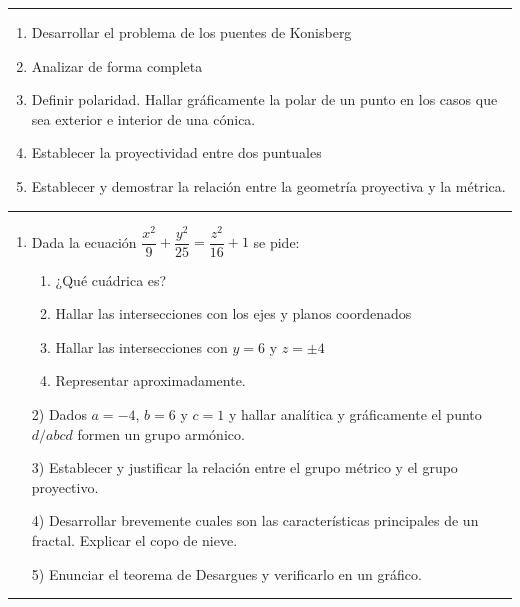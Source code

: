 \documentclass[9pt,a4paper]{extarticle}
\begin{document}
\hrule
{}
\begin{enumerate}

\item Desarrollar el problema de los puentes de Konisberg

\item Analizar de forma completa 

\item Definir polaridad. Hallar gráficamente la polar de un punto en los casos que sea exterior e interior de una cónica.

\item Establecer la proyectividad entre dos puntuales

\item Establecer y demostrar la relación entre la geometría proyectiva y la métrica. 

\end{enumerate}
\hrule

\begin{enumerate}

\item Dada la ecuación $\dfrac{x^2}{9} + \dfrac{y^2}{25}=\dfrac{z^2}{16}+1 $ se pide:  
\begin{enumerate}
    \item ¿Qué cuádrica es?
\item Hallar las intersecciones con los ejes y planos coordenados
\item Hallar las intersecciones con $y=6$  y  $z= \pm 4$ 
\item Representar aproximadamente. 
\end{enumerate}


2) Dados $a=-4$, $b=6$ y $c=1$  y  hallar analítica y gráficamente el punto $d / abcd$ formen un grupo armónico.

3) Establecer y justificar la relación entre el grupo métrico y el grupo proyectivo.

4) Desarrollar brevemente cuales son las características principales de un fractal. Explicar el copo de nieve.

5) Enunciar el teorema de Desargues y verificarlo en un gráfico.

\end{enumerate}
\hrule
\end{document}
